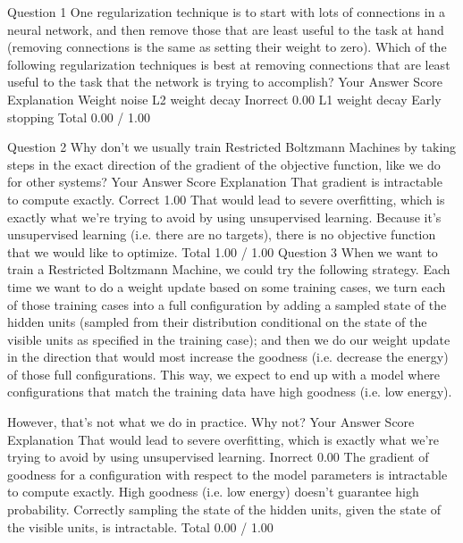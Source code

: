 Question 1
One regularization technique is to start with lots of connections in a neural network, and then remove those that are least useful to the task at hand (removing connections is the same as setting their weight to zero). Which of the following regularization techniques is best at removing connections that are least useful to the task that the network is trying to accomplish?
Your Answer		Score	Explanation
Weight noise			
L2 weight decay	Inorrect	0.00	
L1 weight decay			
Early stopping			
Total		0.00 / 1.00	

Question 2
Why don't we usually train Restricted Boltzmann Machines by taking steps in the exact direction of the gradient of the objective function, like we do for other systems?
Your Answer		Score	Explanation
That gradient is intractable to compute exactly.	Correct	1.00	
That would lead to severe overfitting, which is exactly what we're trying to avoid by using unsupervised learning.			
Because it's unsupervised learning (i.e. there are no targets), there is no objective function that we would like to optimize.			
Total		1.00 / 1.00	
Question 3
When we want to train a Restricted Boltzmann Machine, we could try the following strategy. Each time we want to do a weight update based on some training cases, we turn each of those training cases into a full configuration by adding a sampled state of the hidden units (sampled from their distribution conditional on the state of the visible units as specified in the training case); and then we do our weight update in the direction that would most increase the goodness (i.e. decrease the energy) of those full configurations. This way, we expect to end up with a model where configurations that match the training data have high goodness (i.e. low energy).

However, that's not what we do in practice. Why not?
Your Answer		Score	Explanation
That would lead to severe overfitting, which is exactly what we're trying to avoid by using unsupervised learning.	Inorrect	0.00	
The gradient of goodness for a configuration with respect to the model parameters is intractable to compute exactly.			
High goodness (i.e. low energy) doesn't guarantee high probability.			
Correctly sampling the state of the hidden units, given the state of the visible units, is intractable.			
Total		0.00 / 1.00	

